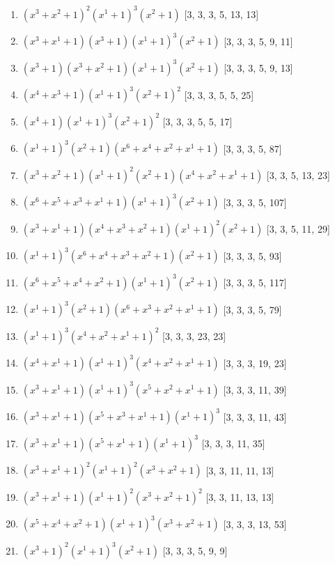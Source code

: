 \documentclass[10pt,twocolumn]{article}
\begin{document}
\begin{enumerate}
\item $(x^{3} + x^{2} + 1)^{2}(x^{1} + 1)^{3}(x^{2} + 1)$  [3, 3, 3, 5, 13, 13]
\item $(x^{3} + x^{1} + 1)(x^{3} + 1)(x^{1} + 1)^{3}(x^{2} + 1)$  [3, 3, 3, 5, 9, 11]
\item $(x^{3} + 1)(x^{3} + x^{2} + 1)(x^{1} + 1)^{3}(x^{2} + 1)$  [3, 3, 3, 5, 9, 13]
\item $(x^{4} + x^{3} + 1)(x^{1} + 1)^{3}(x^{2} + 1)^{2}$  [3, 3, 3, 5, 5, 25]
\item $(x^{4} + 1)(x^{1} + 1)^{3}(x^{2} + 1)^{2}$  [3, 3, 3, 5, 5, 17]
\item $(x^{1} + 1)^{3}(x^{2} + 1)(x^{6} + x^{4} + x^{2} + x^{1} + 1)$  [3, 3, 3, 5, 87]
\item $(x^{3} + x^{2} + 1)(x^{1} + 1)^{2}(x^{2} + 1)(x^{4} + x^{2} + x^{1} + 1)$  [3, 3, 5, 13, 23]
\item $(x^{6} + x^{5} + x^{3} + x^{1} + 1)(x^{1} + 1)^{3}(x^{2} + 1)$  [3, 3, 3, 5, 107]
\item $(x^{3} + x^{1} + 1)(x^{4} + x^{3} + x^{2} + 1)(x^{1} + 1)^{2}(x^{2} + 1)$  [3, 3, 5, 11, 29]
\item $(x^{1} + 1)^{3}(x^{6} + x^{4} + x^{3} + x^{2} + 1)(x^{2} + 1)$  [3, 3, 3, 5, 93]
\item $(x^{6} + x^{5} + x^{4} + x^{2} + 1)(x^{1} + 1)^{3}(x^{2} + 1)$  [3, 3, 3, 5, 117]
\item $(x^{1} + 1)^{3}(x^{2} + 1)(x^{6} + x^{3} + x^{2} + x^{1} + 1)$  [3, 3, 3, 5, 79]
\item $(x^{1} + 1)^{3}(x^{4} + x^{2} + x^{1} + 1)^{2}$  [3, 3, 3, 23, 23]
\item $(x^{4} + x^{1} + 1)(x^{1} + 1)^{3}(x^{4} + x^{2} + x^{1} + 1)$  [3, 3, 3, 19, 23]
\item $(x^{3} + x^{1} + 1)(x^{1} + 1)^{3}(x^{5} + x^{2} + x^{1} + 1)$  [3, 3, 3, 11, 39]
\item $(x^{3} + x^{1} + 1)(x^{5} + x^{3} + x^{1} + 1)(x^{1} + 1)^{3}$  [3, 3, 3, 11, 43]
\item $(x^{3} + x^{1} + 1)(x^{5} + x^{1} + 1)(x^{1} + 1)^{3}$  [3, 3, 3, 11, 35]
\item $(x^{3} + x^{1} + 1)^{2}(x^{1} + 1)^{2}(x^{3} + x^{2} + 1)$  [3, 3, 11, 11, 13]
\item $(x^{3} + x^{1} + 1)(x^{1} + 1)^{2}(x^{3} + x^{2} + 1)^{2}$  [3, 3, 11, 13, 13]
\item $(x^{5} + x^{4} + x^{2} + 1)(x^{1} + 1)^{3}(x^{3} + x^{2} + 1)$  [3, 3, 3, 13, 53]
\item $(x^{3} + 1)^{2}(x^{1} + 1)^{3}(x^{2} + 1)$  [3, 3, 3, 5, 9, 9]

\end{enumerate}
\end{document}
